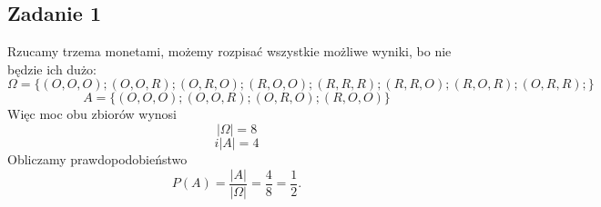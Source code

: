 \subsection{Zadanie 1}

Rzucamy trzema monetami, możemy rozpisać wszystkie możliwe wyniki, bo nie będzie ich dużo:
$$
\Omega=\{ (O,O,O); (O,O,R); (O,R,O); (R,O,O); (R,R,R); (R,R,O); (R,O,R); (O,R,R);\}
$$
$$
A=\{ (O,O,O); (O,O,R); (O,R,O); (R,O,O)\}
$$
Więc moc obu zbiorów wynosi
$$
|\Omega|=8
$$
$$
i|A|=4
$$
Obliczamy prawdopodobieństwo 
$$
P(A)=\frac{|A|}{|\Omega|}=\frac{4}{8}=\frac{1}{2}.
$$

